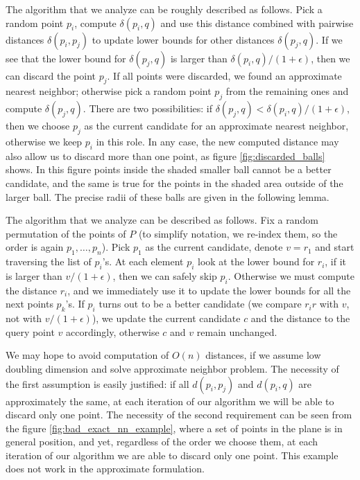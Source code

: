 \documentclass[a4paper,USenglish]{socg-lipics-v2018}
\newcommand{\eps}{\epsilon}
\newcommand{\dist}{\delta}
\begin{document}
\begin{algorithmic}
\label{alg:ann_blind}
        \State {$a_k \gets \max(a_k, |\dist(p_i, p_k) - r_i|)$}
    \EndFor
\EndProcedure

The algorithm that we analyze can be roughly described as follows. 
Pick a random point $p_i$,
compute $\dist(p_i, q)$ and use this distance combined with pairwise distances $\dist(p_i, p_j)$
to update lower bounds for other distances $\dist(p_j, q)$.
If we see that the lower bound for $\dist(p_j, q)$ is larger than $\dist(p_i, q) / (1+\eps)$, then 
we can discard the point $p_j$. If all points were discarded, we found an approximate nearest neighbor;
otherwise pick a random point $p_j$ from the remaining ones and compute $\dist(p_j, q)$.
There are two possibilities: if $\dist(p_j, q) < \dist(p_i, q) / (1+\eps)$,
then we choose $p_j$ as the current candidate for an approximate nearest neighbor,
otherwise we keep $p_i$ in this role. In any case, the new computed distance
may also allow us to discard more than one point, as figure \ref{fig:discarded_balls} shows. In
this figure points inside the shaded smaller ball cannot be a better candidate,
and the same is true for the points in the shaded area outside of the larger ball.
The precise radii of these balls are given in the following lemma.


The algorithm that we analyze can be described as follows. 
Fix a random permutation of the points of $P$ (to simplify notation,
we re-index them, so the order is again $p_1, \dots, p_n$). Pick $p_1$
as the current candidate, denote $v = r_1$ and start traversing the list of $p_i$'s.
At each element $p_i$ look at the lower bound for $r_i$,
if it is larger than $v / (1+\eps)$, then we can safely skip $p_i$.
Otherwise we must compute the distance $r_i$, and we immediately
 use it to update the lower bounds for all the next points $p_k$'s. 
If $p_i$ turns out to be a better candidate (we compare $r_ir$ with $v$, not with $v/(1+\eps)$),
we update the current candidate $c$ and the distance to the query point $v$ accordingly, 
otherwise $c$ and $v$ remain unchanged.


We may hope to avoid computation of $O(n)$ distances, if we assume low doubling dimension
and solve approximate neighbor problem. The necessity of the first assumption is easily justified: if all $d(p_i, p_j)$
and $d(p_i, q)$ are approximately the same, at each iteration of our algorithm we will be able to discard only one point.
The necessity of the second requirement can be seen from the figure \ref{fig:bad_exact_nn_example},
where a set of points in the plane is in general position, and yet, regardless of the order we choose them,
at each iteration of our algorithm we are able to discard only one point. This example does not work in the
approximate formulation.



\end{algorithmic}
\end{document}
